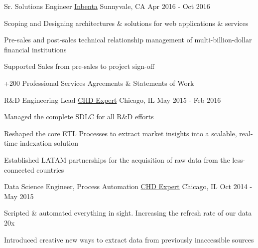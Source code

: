 \begin{cventries}
  \cventry
    {Sr. Solutions Engineer} %
    {\href{https://www.inbenta.com}{Inbenta}} %
    {Sunnyvale, CA} %
    {Apr 2016 - Oct 2016} %
    {
      \begin{cvitems} %
        \item {Scoping and Designing architectures \& solutions for web applications \& services}
        \item {Pre-sales and post-sales technical relationship management of multi-billion-dollar financial institutions}
        \item {Supported Sales from pre-sales to project sign-off}
        \item {+200 Professional Services Agreements \& Statements of Work}
      \end{cvitems}
    }

  \cventry
    {R\&D Engineering Lead} %
    {\href{https://www.chd-expert.com}{CHD Expert}} %
    {Chicago, IL} %
    {May 2015 - Feb 2016} %
    { 
      \begin{cvitems} %
        \item {Managed the complete SDLC for all R\&D efforts}
        \item {Reshaped the core ETL Processes to extract market insights into a scalable, real-time indexation solution}
        \item {Established LATAM partnerships for the acquisition of raw data from the less-connected countries}
      \end{cvitems}
    }
  \cventry
    {Data Science Engineer, Process Automation} %
    {\href{https://www.chd-expert.com}{CHD Expert}} %
    {Chicago, IL} %
    {Oct 2014 - May 2015} %
    {
      \begin{cvitems} %
        \item {Scripted \& automated everything in sight. Increasing the refresh rate of our data 20x}
        \item {Introduced creative new ways to extract data from previously inaccessible sources}
      \end{cvitems}
    }
\end{cventries}
